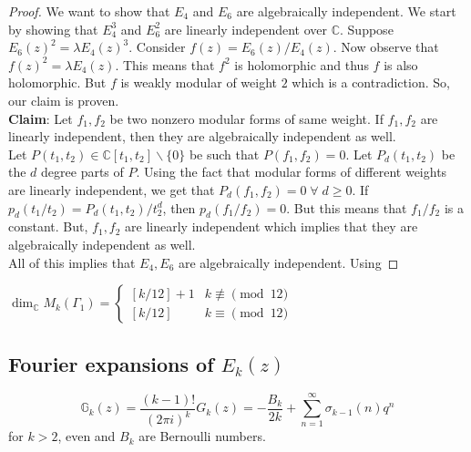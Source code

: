 \documentclass[oneside, 12pt, ]{scrbook}
\newcommand{\CC}{\mathbb C}
\theoremstyle{theorem}
\begin{document}
\begin{proof}
We want to show that $E_{4}$ and $E_{6}$ are algebraically independent. We start by showing that $E_{4}^3$ and $E_{6}^2$ are linearly independent over $\CC$. Suppose $E_{6}(z)^2 = \lambda E_{4}(z)^{3}$. Consider $f(z) = E_{6}(z)/ E_{4}(z)$. Now observe that $f(z)^2 = \lambda E_{4}(z)$. This means that $f^2$ is holomorphic and thus $f$ is also holomorphic. But $f$ is weakly modular of weight $2$ which is a contradiction. So, our claim is proven. \\

\textbf{Claim}: Let $f_{1},f_{2}$ be two nonzero modular forms of same weight. If $f_{1},f_{2}$ are linearly independent, then they are algebraically independent as well. \\

Let $P(t_{1},t_{2}) \in \CC[t_{1},t_{2}] \backslash \{0\}$ be such that $P(f_{1},f_{2})=0$. Let $P_{d}(t_{1},t_{2})$ be the $d$ degree parts of $P$. Using the fact that modular forms of different weights are linearly independent, we get that $P_{d}(f_{1},f_{2})=0 \; \forall \; d \geq 0$. If $p_{d}(t_{1}/t_{2}) = P_{d}(t_{1},t_{2})/t_{2}^d$, then $p_{d}(f_{1}/f_{2})=0$. But this means that $f_{1}/f_{2}$ is a constant. But, $f_{1},f_{2}$ are linearly independent which implies that they are algebraically independent as well. \\

All of this implies that $E_{4},E_{6}$ are algebraically independent. Using
\end{proof}

\begin{corollary}
$\dim_{\CC} M_{k} (\Gamma_{1}) = \begin{cases}[k/12]+1 & k\not \equiv \pmod{12} \\ [k/12] & k \equiv \pmod{12} \end{cases} $
\end{corollary}

\subsection{Fourier expansions of $E_{k}(z)$}

\begin{proposition}
$$\mathbb{G}_{k}(z) = \frac{(k-1)!}{(2 \pi i)^k} G_{k}(z) = -\frac{B_{k}}{2k} + \sum_{n=1}^{\infty} \sigma_{k-1}(n)q^n$$ for $k>2$, even and $B_{k}$ are Bernoulli numbers.
\end{proposition}
\end{document}
